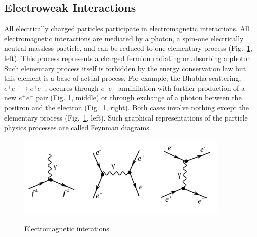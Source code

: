\subsection{Electroweak Interactions}
\label{sec:Intro_Electroweak}




All electrically charged particles participate in electromagnetic interactions. All electromagnetic interactions are mediated by a photon, a spin-one electrically neutral massless particle, and can be reduced to one elementary process (Fig.~\ref{fig:feynmEM}, left). This process represents a charged fermion radiating or absorbing a photon. Such elementary process itself is forbidden by the energy conservation law but this element is a base of actual process. For example, the Bhabha scattering, $e^+e^- \rightarrow e^+e^-$, occures through $e^+e^-$ annihilation with further production of a new $e^+e^-$ pair (Fig. \ref{fig:feynmEM}, middle) or through exchange of a photon between the positron and the electron (Fig.~\ref{fig:feynmEM}, right). Both cases involve nothing except the elementary process (Fig.~\ref{fig:feynmEM}, left). Such graphical representations of the particle physics processes are called Feynman diagrams.\\ 

\begin{figure}[htb]
  \begin{center}
    {\includegraphics[width=0.90\textwidth]{../figs/Intro/feynmEM.png}}
    \caption{Electromagnetic interations}
    \label{fig:feynmEM}
  \end{center}
\end{figure}

